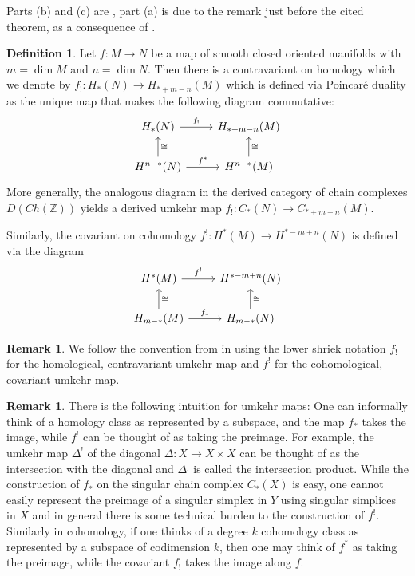 \documentclass{scrartcl}
\let\emph\relax
\newcommand{\emphi}[1]{\index{#1}\emph{#1}}
\theoremstyle{plain}
\theoremstyle{definition}
\newtheorem{definition}[theorem]{Definition}
\newtheorem{remark}[theorem]{Remark}
\newcommand{\Z}{\mathbb Z}
\newcommand{\iso}{\cong}
\begin{document}
Parts (b) and (c) are \cite[Thm 3.43]{hatcher2002algebraic}, part (a) is due to the remark just before the cited theorem, as a consequence of \cite[Thm 3.27]{hatcher2002algebraic}. 


\begin{definition}
Let $f\colon M\to  N$ be a map of smooth closed oriented manifolds with $m=\dim M$ and $n=\dim N$. Then there is a contravariant \emphi{umkehr map} on homology which we denote by $f_!\colon H_*(N)\to H_{*+m-n}(M)$ which is defined via Poincaré duality as the unique map that makes the following diagram commutative:
\begin{equation}
    \begin{tikzcd}
        H_*(N)  \rar["f_!"] & H_{*+m-n}(M)  \\
        H^{n-*}(N) \uar[swap, "\iso"]\rar["f^*"] & H^{n-*}(M) \uar[swap, "\iso"]
    \end{tikzcd}
\end{equation}
More generally, the analogous diagram in the derived category of chain complexes $D(Ch(\Z))$ yields a derived umkehr map $f_! \colon C_*(N) \to C_{*+m-n}(M)$.

Similarly, the covariant \emph{umkehr map} on cohomology $f^!\colon H^*(M)\to H^{*-m+n}(N)$ is defined via the diagram
\begin{equation}
    \begin{tikzcd}
        H^*(M)  \rar["f^!"] & H^{*-m+n}(N)  \\
        H_{m-*}(M) \uar[swap, "\iso"]\rar["f_*"] & H_{m-*}(N) \uar[swap, "\iso"]
    \end{tikzcd}
\end{equation}
\end{definition}

\begin{remark}
    We follow the convention from \cite{bredon2013topology} in using the lower shriek notation $f_!$ for the homological, contravariant umkehr map and $f^!$ for the cohomological, covariant umkehr map. 
\end{remark}

\begin{remark}
    There is the following intuition for umkehr maps: One can informally think of a homology class as represented by a subspace, and the map $f_*$ takes the image, while $f^!$ can be thought of as taking the preimage. For example, the umkehr map $\Delta^!$ of the diagonal $\Delta\colon X\to X\times X$ can be thought of as the intersection with the diagonal and $\Delta_!$ is called the intersection product. While the construction of $f_*$ on the singular chain complex $C_*(X)$ is easy, one cannot easily represent the preimage of a singular simplex in $Y$ using singular simplices in $X$ and in general there is some technical burden to the construction of $f^!$. Similarly in cohomology, if one thinks of a degree $k$ cohomology class as represented by a subspace of codimension $k$, then one may think of $f^*$ as taking the preimage, while the covariant $f_!$ takes the image along $f$. 
\end{remark}
\end{document}
